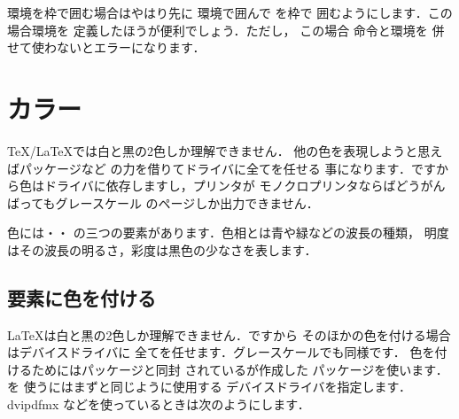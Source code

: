環境を枠で囲む場合はやはり先に
環境で囲んで を枠で
囲むようにします．この場合環境を
定義したほうが便利でしょう．ただし，
この場合 命令と環境を
併せて使わないとエラーになります．



















\section{カラー}

{\TeX/\LaTeX}では白と黒の2色しか理解できません．
他の色を表現しようと思えばパッケージなど
の力を借りてドライバに全てを任せる
事になります．ですから色はドライバに依存しますし，プリンタが
モノクロプリンタならばどうがんばってもグレースケール
のページしか出力できません．

色には{}・{}・{}
の三つの要素があります．色相とは青や緑などの波長の種類，
明度はその波長の明るさ，彩度は黒色の少なさを表します．

\subsection{要素に色を付ける}
{\LaTeX}は白と黒の2色しか理解できません．ですから
そのほかの色を付ける場合はデバイスドライバに
全てを任せます．グレースケールでも同様です．
色を付けるためにはパッケージと同封
されているが作成した
パッケージを使います．を
使うにはまずと同じように使用する
デバイスドライバを指定します．{dvipdfmx}
などを使っているときは次のようにします．

